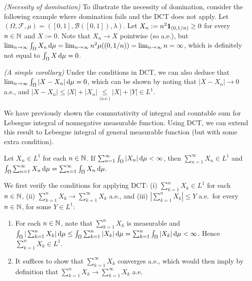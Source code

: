\begin{enumerate}
\begin{remark}
\item \emph{(Necessity of domination)} To illustrate the necessity of
domination, consider the following example where domination fails and the DCT
does not apply. Let \((\Omega,\mathcal{F},\mu)=([0,1],\mathcal{B}([0,1]),\lambda)\).
Let \(X_n:=n^{2}\mathbf{1}_{(0,1/n)}\ge 0\) for every \(n\in\mathbb{N}\) and \(X:=0\). Note
that \(X_n\to X\) pointwise (so a.e.), but \(\lim_{n\to\infty}\int_{\Omega}^{}X_n\odif{\mu}
=\lim_{n\to\infty}n^{2}\mu((0,1/n))=\lim_{n\to\infty}n=\infty\), which is
definitely not equal to \(\int_{\Omega}^{}X\odif{\mu}=0\).
\item \emph{(A simple corollary)} Under the conditions in DCT, we can also
deduce that \(\lim_{n\to\infty}\int_{\Omega}^{}|X-X_n|\odif{\mu}=0\), which can
be shown by noting that \(|X-X_n|\to 0\) a.e., and \(|X-X_n|\le
|X|+|X_n|\underset{\text{(a.e.)}}{\le}|X|+|Y|\in L^{1}\).
\end{remark}
We have previously shown the commutativity of integral and countable sum for
Lebesgue integral of nonnegative measurable function. Using DCT, we can extend
this result to Lebesgue integral of general measurable function (but with some
extra condition).
\begin{corollary}
\label{cor:leb-int-sum-commu}
Let \(X_n\in L^{1}\) for each \(n\in\mathbb{N}\). If
\(\sum_{n=1}^{\infty}\int_{\Omega}^{}|X_n|\odif{\mu}<\infty\), then
\(\sum_{n=1}^{\infty}X_n\in L^{1}\) and
\(\int_{\Omega}^{}\sum_{n=1}^{\infty}X_n\odif{\mu}=\sum_{n=1}^{\infty}\int_{\Omega}^{}X_n\odif{\mu}\).
\end{corollary}
\begin{pf}
We first verify the conditions for applying DCT: (i) \(\sum_{k=1}^{n}X_k\in L^{1}\) for each
\(n\in\mathbb{N}\), (ii) \(\sum_{k=1}^{n}X_k\to \sum_{k=1}^{\infty}X_k\) a.e., and
(iii) \(|\sum_{k=1}^{n}X_k|\le Y\) a.e.\ for every \(n\in\mathbb{N}\), for some \(Y\in L^{1}\):
\begin{enumerate}[label={(\roman*)}]
\item For each \(n\in\mathbb{N}\), note that \(\sum_{k=1}^{n}X_k\) is measurable and
\(\int_{\Omega}^{}|\sum_{k=1}^{n}X_k|\odif{\mu}
\le\int_{\Omega}^{}\sum_{k=1}^{n}|X_k|\odif{\mu}
=\sum_{k=1}^{n}\int_{\Omega}^{}|X_k|\odif{\mu}<\infty
\). Hence \(\sum_{k=1}^{n}X_k\in L^{1}\).
\item It suffices to show that \(\sum_{k=1}^{\infty}X_k\) converges a.e., which
would then imply by definition that \(\sum_{k=1}^{n}X_k\to \sum_{k=1}^{\infty}X_k\) a.e.


\end{enumerate}
\end{pf}
\end{enumerate}
